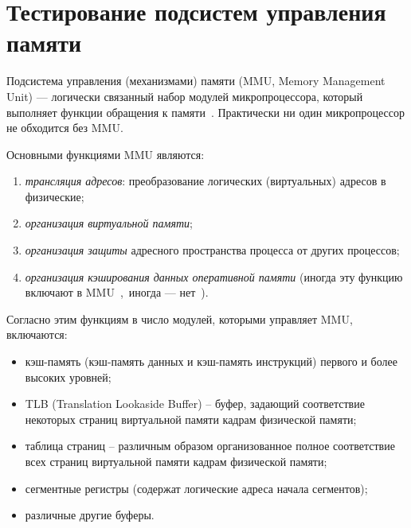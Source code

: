%
%
%


\section{Тестирование подсистем управления памяти}\label{section:cache}

Подсистема управления (механизмами) памяти (MMU, Memory Management Unit) ---
логически связанный набор модулей микропроцессора, который выполняет
функции обращения к памяти~\cite{MMU}. Практически ни один
микропроцессор не обходится без MMU.

Основными функциями MMU являются:
\begin{enumerate}
  \item \emph{трансляция адресов}: преобразование логических (виртуальных) адресов в физические;
  \item \emph{организация виртуальной памяти};
  \item \emph{организация защиты} адресного пространства процесса от других процессов;
  \item \emph{организация кэширования данных оперативной памяти} (иногда эту функцию включают в MMU~\cite{vorobyev},~иногда --- нет~\cite{thompson}).
\end{enumerate}

Согласно этим функциям в число модулей, которыми управляет MMU, включаются:
\begin{itemize}
  \item кэш-память (кэш-память данных и кэш-память инструкций)  первого и более высоких уровней;
  \item TLB (Translation Lookaside Buffer) -- буфер, задающий
  соответствие некоторых страниц виртуальной памяти кадрам
  физической памяти;
  \item таблица страниц -- различным образом организованное полное соответствие всех страниц виртуальной памяти кадрам физической памяти;
  \item сегментные регистры (содержат логические адреса начала сегментов);
  \item различные другие буферы.
\end{itemize}

